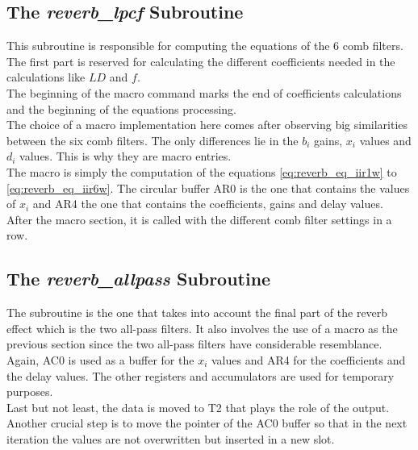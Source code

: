 \subsection{The \textit{reverb_lpcf} Subroutine}

This subroutine is responsible for computing the equations of the 6 comb filters. \\
The first part is reserved for calculating the different coefficients needed in the calculations like $LD$ and $f$. \\
The beginning of the macro command marks the end of coefficients calculations and the beginning of the equations processing. \\
The choice of a macro implementation here comes after observing big similarities between the six comb filters. The only differences lie in the $b_{i}$ gains, $x_{i}$ values and $d_{i}$ values. This is why they are macro entries. \\
The macro is simply the computation of the equations \ref{eq:reverb_eq_iir1w} to \ref{eq:reverb_eq_iir6w}. The circular buffer AR0 is the one that contains the values of $x_{i}$ and AR4 the one that contains the coefficients, gains and delay values. \\
After the macro section, it is called with the different comb filter settings in a row. 

\subsection{The \textit{reverb_allpass} Subroutine}

The subroutine is the one that takes into account the final part of the reverb effect which is the two all-pass filters. It also involves the use of a macro as the previous section since the two all-pass filters have considerable resemblance. \\
Again, AC0 is used as a buffer for the $x_{i}$ values and AR4 for the coefficients and the delay values. The other registers and accumulators are used for temporary purposes. \\
Last but not least, the data is moved to T2 that plays the role of the output. 
Another crucial step is to move the pointer of the AC0 buffer so that in the next iteration the values are not overwritten but inserted in a new slot. \\





